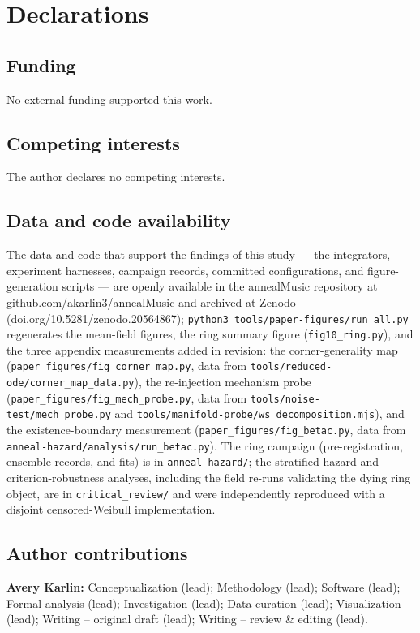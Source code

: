 \documentclass[pdflatex,sn-mathphys,Numbered]{sn-jnl}
\begin{document}
\section*{Declarations}

\subsection*{Funding}
No external funding supported this work.

\subsection*{Competing interests}
The author declares no competing interests.

\subsection*{Data and code availability}
The data and code that support the findings of this study --- the integrators,
experiment harnesses, campaign records, committed configurations, and
figure-generation scripts --- are openly available in the annealMusic repository at
github.com/akarlin3/annealMusic and archived at Zenodo
(doi.org/10.5281/zenodo.20564867); \texttt{python3 tools/paper-figures/run\_all.py}
regenerates the mean-field figures, the ring summary figure
(\texttt{fig10\_ring.py}), and the three appendix measurements added in revision:
the corner-generality map (\texttt{paper\_figures/fig\_corner\_map.py}, data from
\texttt{tools/reduced-ode/corner\_map\_data.py}), the re-injection mechanism
probe (\texttt{paper\_figures/fig\_mech\_probe.py}, data from
\texttt{tools/noise-test/mech\_probe.py} and
\texttt{tools/manifold-probe/ws\_decomposition.mjs}), and the existence-boundary
measurement (\texttt{paper\_figures/fig\_betac.py}, data from
\texttt{anneal-hazard/analysis/run\_betac.py}). The ring
campaign (pre-registration, ensemble records, and fits) is in
\texttt{anneal-hazard/}; the stratified-hazard and criterion-robustness analyses,
including the field re-runs validating the dying ring object, are in
\texttt{critical\_review/} and were independently reproduced with a disjoint
censored-Weibull implementation.

\subsection*{Author contributions}
\textbf{Avery Karlin:} Conceptualization (lead); Methodology (lead); Software
(lead); Formal analysis (lead); Investigation (lead); Data curation (lead);
Visualization (lead); Writing -- original draft (lead); Writing -- review \&
editing (lead).
\end{document}
